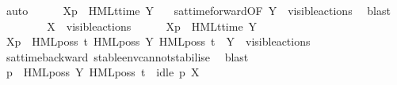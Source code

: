 \begin{isabellebody}
\ auto\isanewline
\isanewline
\ \ \ \ \isamarkupfalse%
\ {\isacartoucheopen}{\isasymtheta}{\isacharbrackleft}{\kern0pt}X{\isacharbrackright}{\kern0pt}{\isacharparenleft}{\kern0pt}p{\isacharparenright}{\kern0pt}\ {\isasymTurnstile}\ {\isasymsigma}{\isacharparenleft}{\kern0pt}HMLt{\isacharunderscore}{\kern0pt}time\ Y\ {\isasymphi}{\isacharparenright}{\kern0pt}{\isacartoucheclose}\ \isamarkupfalse%
\ sat{\isacharunderscore}{\kern0pt}time{\isacharunderscore}{\kern0pt}forward{\isacharbrackleft}{\kern0pt}OF\ {\isacartoucheopen}Y\ {\isasymsubseteq}\ visible{\isacharunderscore}{\kern0pt}actions{\isacartoucheclose}{\isacharbrackright}{\kern0pt}\ \isamarkupfalse%
\ blast\isanewline
\ \ \isamarkupfalse%
\isanewline
\ \ \ \ \isamarkupfalse%
\ {\isacartoucheopen}X\ {\isasymsubseteq}\ visible{\isacharunderscore}{\kern0pt}actions{\isacartoucheclose}\isanewline
\ \ \ \ \isamarkupfalse%
\ {\isacartoucheopen}{\isasymtheta}{\isacharbrackleft}{\kern0pt}X{\isacharbrackright}{\kern0pt}{\isacharparenleft}{\kern0pt}p{\isacharparenright}{\kern0pt}\ {\isasymTurnstile}\ {\isasymsigma}{\isacharparenleft}{\kern0pt}HMLt{\isacharunderscore}{\kern0pt}time\ Y\ {\isasymphi}{\isacharparenright}{\kern0pt}{\isacartoucheclose}\isanewline
\ \ \ \ \isamarkupfalse%
\ {\isacartoucheopen}{\isasymtheta}{\isacharbrackleft}{\kern0pt}X{\isacharbrackright}{\kern0pt}{\isacharparenleft}{\kern0pt}p{\isacharparenright}{\kern0pt}\ {\isasymTurnstile}\ HML{\isacharunderscore}{\kern0pt}poss\ t{\isacharunderscore}{\kern0pt}{\isasymepsilon}\ {\isacharparenleft}{\kern0pt}HML{\isacharunderscore}{\kern0pt}poss\ {\isacharparenleft}{\kern0pt}{\isasymepsilon}{\isacharbrackleft}{\kern0pt}Y{\isacharbrackright}{\kern0pt}{\isacharparenright}{\kern0pt}\ {\isacharparenleft}{\kern0pt}HML{\isacharunderscore}{\kern0pt}poss\ t\ {\isasymsigma}{\isacharparenleft}{\kern0pt}{\isasymphi}{\isacharparenright}{\kern0pt}{\isacharparenright}{\kern0pt}{\isacharparenright}{\kern0pt}{\isacartoucheclose}\ {\isacartoucheopen}Y\ {\isasymsubseteq}\ visible{\isacharunderscore}{\kern0pt}actions{\isacartoucheclose}\ \isanewline
\ \ \ \ \ \ \isamarkupfalse%
\ sat{\isacharunderscore}{\kern0pt}time{\isacharunderscore}{\kern0pt}backward\ stable{\isacharunderscore}{\kern0pt}env{\isacharunderscore}{\kern0pt}cannot{\isacharunderscore}{\kern0pt}stabilise\ \isamarkupfalse%
\ blast{\isacharplus}{\kern0pt}\isanewline
\ \ \ \ \isamarkupfalse%
\ {\isacartoucheopen}{\isasymtheta}{\isacharparenleft}{\kern0pt}p{\isacharparenright}{\kern0pt}\ {\isasymTurnstile}\ HML{\isacharunderscore}{\kern0pt}poss\ {\isacharparenleft}{\kern0pt}{\isasymepsilon}{\isacharbrackleft}{\kern0pt}Y{\isacharbrackright}{\kern0pt}{\isacharparenright}{\kern0pt}\ {\isacharparenleft}{\kern0pt}HML{\isacharunderscore}{\kern0pt}poss\ t\ {\isasymsigma}{\isacharparenleft}{\kern0pt}{\isasymphi}{\isacharparenright}{\kern0pt}{\isacharparenright}{\kern0pt}{\isacartoucheclose}\ {\isacartoucheopen}idle\ p\ X{\isacartoucheclose}\ \isanewline

\end{isabellebody}
